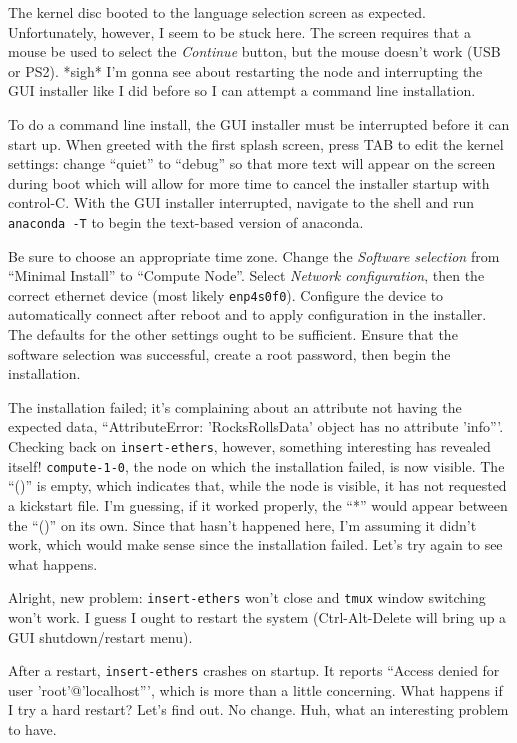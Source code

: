 \documentclass[12pt]{article}
\begin{document}
\qq The kernel disc booted to the language selection screen as
expected. Unfortunately, however, I seem to be stuck here. The screen requires
that a mouse be used to select the \textit{Continue} button, but the mouse
doesn't work (USB or PS2). *sigh* I'm gonna see about restarting the node and
interrupting the GUI installer like I did before so I can attempt a command line
installation. 

\qq To do a command line install, the GUI installer must be interrupted before
it can start up. When greeted with the first splash screen, press TAB to edit
the kernel settings: change ``quiet'' to ``debug'' so that more text will appear
on the screen during boot which will allow for more time to cancel the installer
startup with control-C. With the GUI installer interrupted, navigate to the
shell and run {\tt anaconda -T} to begin the text-based version of
anaconda.

\qq Be sure to choose an appropriate time zone. Change the \textit{Software
  selection} from ``Minimal Install'' to ``Compute Node''. Select
\textit{Network configuration}, then the correct ethernet device (most
likely {\tt enp4s0f0}). Configure the device to automatically connect after
reboot and to apply configuration in the installer. The defaults for the other
settings ought to be sufficient. Ensure that the software selection was
successful, create a root password, then begin the installation.

\qq The installation failed; it's complaining about an attribute not having the
expected data, ``AttributeError: 'RocksRollsData' object has no attribute
'info'''. Checking back on {\tt insert-ethers}, however, something interesting
has revealed itself! {\tt compute-1-0}, the node on which the installation
failed, is now visible. The ``()'' is empty, which indicates that, while the
node is visible, it has not requested a kickstart file. I'm guessing, if it
worked properly, the ``*'' would appear between the ``()'' on its own. Since
that hasn't happened here, I'm assuming it didn't work, which would make sense
since the installation failed. Let's try again to see what happens.

\qq Alright, new problem: {\tt insert-ethers} won't close and {\tt tmux} window
switching won't work. I guess I ought to restart the system (Ctrl-Alt-Delete
will bring up a GUI shutdown/restart menu). 

\qq After a restart, {\tt insert-ethers} crashes on startup. It reports ``Access
denied for user 'root'@'localhost''', which is more than a little
concerning. What happens if I try a hard restart? Let's find out. No
change. Huh, what an interesting problem to have.
\end{document}
